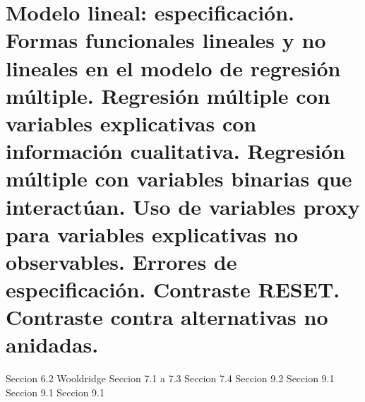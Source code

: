 
\chapter[Modelo lineal: especificaci\'on.]{Modelo lineal: especificaci\'on. \\
\normalsize  Formas funcionales lineales y no lineales en el modelo de regresi\'on m\'ultiple. Regresi\'on m\'ultiple con variables explicativas con informaci\'on cualitativa. Regresi\'on m\'ultiple con variables binarias que interact\'uan. Uso de variables proxy para variables explicativas no observables. Errores de especificaci\'on. Contraste RESET. Contraste contra alternativas no anidadas.}




Seccion 6.2 Wooldridge
Seccion 7.1 a 7.3
Seccion 7.4
Seccion 9.2
Seccion 9.1
Seccion 9.1
Seccion 9.1